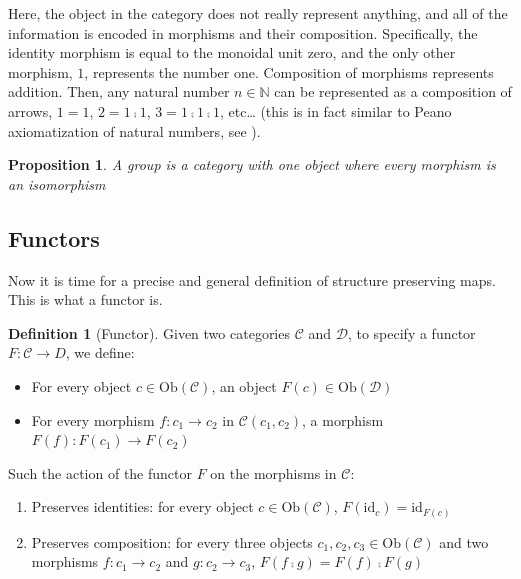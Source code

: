 \documentclass[
]{book}
\providecommand{\tightlist}{%
  \setlength{\itemsep}{0pt}\setlength{\parskip}{0pt}}
\newtheorem{proposition}{Proposition}[chapter]
\theoremstyle{definition}
\newtheorem{definition}{Definition}[chapter]
\theoremstyle{definition}
\theoremstyle{definition}
\theoremstyle{definition}
\theoremstyle{remark}
\begin{document}
Here, the object in the category does not really represent anything, and all of the information is encoded in morphisms and their composition. Specifically, the identity morphism is equal to the monoidal unit zero, and the only other morphism, \(1\), represents the number one. Composition of morphisms represents addition. Then, any natural number \(n \in \mathbb{N}\) can be represented as a composition of arrows, \(1 = 1\), \(2 = 1 ⨾1\), \(3 = 1 ⨾1 ⨾1\), etc\ldots{} (this is in fact similar to Peano axiomatization of natural numbers, see ).

\begin{proposition}
A group is a category with one object where every morphism is an isomorphism
\end{proposition}

\subsection{Functors}\label{functors}

Now it is time for a precise and general definition of structure preserving maps. This is what a functor is.

\begin{definition}[Functor]

Given two categories \(\mathcal{C}\) and \(\mathcal{D}\), to specify a functor \(F: \mathcal{C} \to D\), we define:

\begin{itemize}
\tightlist
\item
  For every object \(c \in \text{Ob}(\mathcal{C})\), an object \(F(c) \in \text{Ob}(\mathcal{D})\)
\item
  For every morphism \(f: c_1 \to c_2\) in \(\mathcal{C}(c_1, c_2)\), a morphism \(F(f): F(c_1) \to F(c_2)\)
\end{itemize}

Such the action of the functor \(F\) on the morphisms in \(\mathcal{C}\):

\begin{enumerate}
\def\labelenumi{\arabic{enumi}.}
\tightlist
\item
  Preserves identities: for every object \(c \in \text{Ob}(\mathcal{C})\), \(F(\text{id}_c) = \text{id}_{F(c)}\)
\item
  Preserves composition: for every three objects \(c_1, c_2, c_3 \in \text{Ob}(\mathcal{C})\) and two morphisms \(f: c_1 \to c_2\) and \(g: c_2 \to c_3\), \(F(f ⨾g) = F(f) ⨾F(g)\)
\end{enumerate}

\end{definition}
\end{document}
